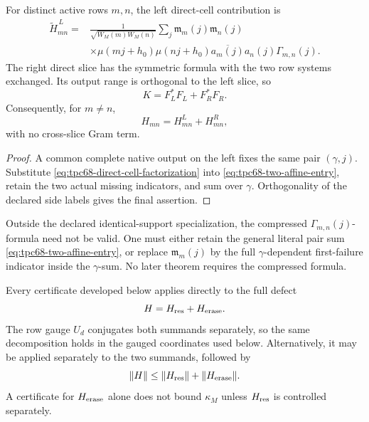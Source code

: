 \begin{corollary}
\label{cor:tpc68-direct-cell-formula}
For distinct active rows \(m,n\), the left direct-cell contribution is
\begin{equation}
 \boxed{
 \begin{aligned}
 \widetilde H^{\,L}_{mn}
 ={}&
 \frac1{\sqrt{W_M(m)W_M(n)}}
 \sum_j
 \mathfrak m_m(j)\mathfrak m_n(j)\\
 &\times
 \mu(mj+h_0)\mu(nj+h_0)
 \overline{a_m(j)}a_n(j)\Gamma_{m,n}(j).
 \end{aligned}}
 \label{eq:tpc68-direct-cell-two-affine}
\end{equation}
The right direct slice has the symmetric formula with the two row systems
exchanged.  Its output range is orthogonal to the left slice, so
\[
 K=F_L^*F_L+F_R^*F_R.
\]
Consequently, for \(m\ne n\),
\[
 H_{mn}=H^L_{mn}+H^R_{mn},
\]
with no cross-slice Gram term.
\end{corollary}

\begin{proof}
A common complete native output on the left fixes the same pair
\((\gamma,j)\).  Substitute
\eqref{eq:tpc68-direct-cell-factorization} into
\eqref{eq:tpc68-two-affine-entry}, retain the two actual missing
indicators, and sum over \(\gamma\).  Orthogonality of the declared side
labels gives the final assertion.
\end{proof}

Outside the declared identical-support specialization, the compressed
\(\Gamma_{m,n}(j)\)-formula need not be valid.  One must either retain the
general literal pair sum \eqref{eq:tpc68-two-affine-entry}, or replace
\(\mathfrak m_m(j)\) by the full \(\gamma\)-dependent first-failure
indicator inside the \(\gamma\)-sum.  No later theorem requires the
compressed formula.

\begin{corollary}
\label{cor:tpc68-full-versus-erasure}
Every certificate developed below applies directly to the full defect
\[
 H=H_{\rm res}+H_{\rm erase}.
\]
The row gauge \(U_d\) conjugates both summands separately, so the same
decomposition holds in the gauged coordinates used below.
Alternatively, it may be applied separately to the two summands, followed
by
\begin{equation}
 \|H\|\le\|H_{\rm res}\|+\|H_{\rm erase}\|.
 \label{eq:tpc68-res-erase-triangle}
\end{equation}
A certificate for \(H_{\rm erase}\) alone does not bound
\(\kappa_M\) unless \(H_{\rm res}\) is controlled separately.
\end{corollary}

